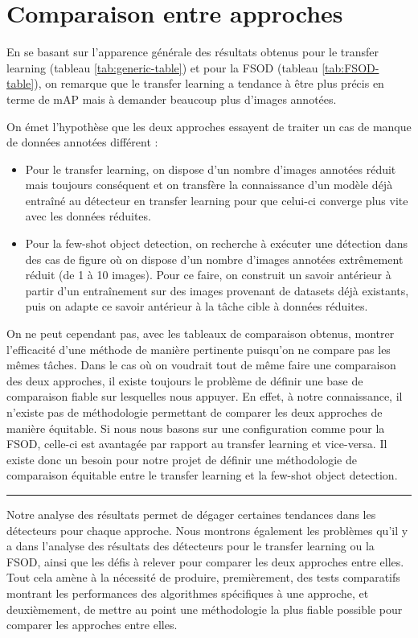 \section{Comparaison entre approches}
\label{sec:analyse-comparaison}
En se basant sur l'apparence générale des résultats obtenus pour le transfer learning (tableau \ref{tab:generic-table}) et pour la FSOD (tableau \ref{tab:FSOD-table}), on remarque que le transfer learning a tendance à être plus précis en terme de mAP mais à demander beaucoup plus d'images annotées.

On émet l'hypothèse que les deux approches essayent de traiter un cas de manque de données annotées différent :
\begin{itemize}
    \item Pour le transfer learning, on dispose d'un nombre d'images annotées réduit mais toujours conséquent et on transfère la connaissance d'un modèle déjà entraîné au détecteur en transfer learning pour que celui-ci converge plus vite avec les données réduites.
    
    \item Pour la few-shot object detection, on recherche à exécuter une détection dans des cas de figure où on dispose d'un nombre d'images annotées extrêmement réduit (de 1 à 10 images). Pour ce faire, on construit un savoir antérieur à partir d'un entraînement sur des images provenant de datasets déjà existants, puis on adapte ce savoir antérieur à la tâche cible à données réduites.
\end{itemize}

On ne peut cependant pas, avec les tableaux de comparaison obtenus, montrer l'efficacité d'une méthode de manière pertinente puisqu'on ne compare pas les mêmes tâches. Dans le cas où on voudrait tout de même faire une comparaison des deux approches, il existe toujours le problème de définir une base de comparaison fiable sur lesquelles nous appuyer. En effet, à notre connaissance, il n'existe pas de méthodologie permettant de comparer les deux approches de manière équitable. Si nous nous basons sur une configuration comme pour la FSOD, celle-ci est avantagée par rapport au transfer learning et vice-versa. Il existe donc un besoin pour notre projet de définir une méthodologie de comparaison équitable entre le transfer learning et la few-shot object detection.


\par\noindent\rule{\textwidth}{0.4pt}

Notre analyse des résultats permet de dégager certaines tendances dans les détecteurs pour chaque approche. Nous montrons également les problèmes qu'il y a dans l'analyse des résultats des détecteurs pour le transfer learning ou la FSOD, ainsi que les défis à relever pour comparer les deux approches entre elles. Tout cela amène à la nécessité de produire, premièrement, des tests comparatifs montrant les performances des algorithmes spécifiques à une approche, et deuxièmement, de mettre au point une méthodologie la plus fiable possible pour comparer les approches entre elles.